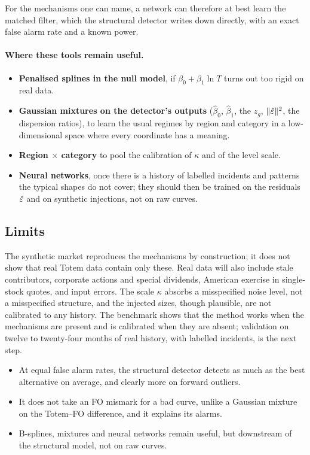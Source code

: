 For the mechanisms one can name, a network can therefore at best learn the matched filter, which the structural
detector writes down directly, with an exact false alarm rate and a known power.

\paragraph{Where these tools remain useful.}
\begin{itemize}
\item \textbf{Penalised splines in the null model}, if $\beta_0+\beta_1\ln T$ turns out too rigid on real data.
\item \textbf{Gaussian mixtures on the detector's outputs} ($\hat\beta_0$, $\hat\beta_1$, the $z_g$, $\lVert \hat\varepsilon\rVert^2$, the
dispersion ratios), to learn the usual regimes by region and category in a low-dimensional space where every
coordinate has a meaning.
\item \textbf{Region $\times$ category} to pool the calibration of $\kappa$ and of the level scale.
\item \textbf{Neural networks}, once there is a history of labelled incidents and patterns the typical shapes do not
cover; they should then be trained on the residuals $\hat\varepsilon$ and on synthetic injections, not on raw curves.
\end{itemize}

\subsection{Limits}
\begin{attention}
The synthetic market reproduces the mechanisms by construction; it does not show that real Totem data contain only
these. Real data will also include stale contributors, corporate actions and special dividends, American exercise in
single-stock quotes, and input errors. The scale $\kappa$ absorbs a misspecified noise level, not a misspecified
structure, and the injected sizes, though plausible, are not calibrated to any history. The benchmark shows that the
method works when the mechanisms are present and is calibrated when they are absent; validation on twelve to
twenty-four months of real history, with labelled incidents, is the next step.
\end{attention}

\begin{retenir}
\begin{itemize}[leftmargin=12pt]
\item At equal false alarm rates, the structural detector detects as much as the best alternative on average, and
clearly more on forward outliers.
\item It does not take an FO mismark for a bad curve, unlike a Gaussian mixture on the Totem--FO difference, and it
explains its alarms.
\item B-splines, mixtures and neural networks remain useful, but downstream of the structural model, not on raw curves.
\end{itemize}
\end{retenir}
